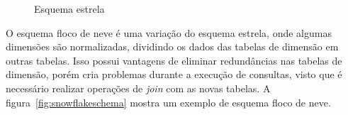 \begin{figure}[!htb]
	\caption{Esquema estrela}\label{fig:starschema}
	\vspace{6mm}
	\begin{center}
	\end{center}
	\vspace{1mm}
	\legenda{}
\end{figure}

O esquema floco de neve é uma variação do esquema estrela, onde algumas dimensões são normalizadas, dividindo os dados das tabelas de dimensão em outras tabelas.
Isso possui vantagens de eliminar redundâncias nas tabelas de dimensão, porém cria problemas durante a execução de consultas, visto que é necessário realizar operações de \textit{join} com as novas tabelas.
A figura~\ref{fig:snowflakeschema} mostra um exemplo de esquema floco de neve.


